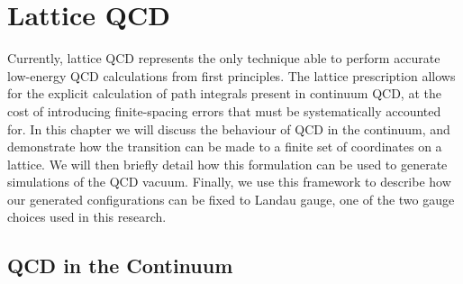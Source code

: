 
\chapter{Lattice QCD}\label{chapter:LatticeQCD}

\ifpdf
    \graphicspath{{Chapter2/Figs/Raster/}{Chapter2/Figs/PDF/}{Chapter2/Figs/}}
\else
    \graphicspath{{Chapter2/Figs/Vector/}{Chapter2/Figs/}}
\fi
Currently, lattice QCD represents the only technique able to perform accurate low-energy QCD calculations from first principles. The lattice prescription allows for the explicit calculation of path integrals present in continuum QCD, at the cost of introducing finite-spacing errors that must be systematically accounted for. In this chapter we will discuss the behaviour of QCD in the continuum, and demonstrate how the transition can be made to a finite set of coordinates on a lattice. We will then briefly detail how this formulation can be used to generate simulations of the QCD vacuum. Finally, we use this framework to describe how our generated configurations can be fixed to Landau gauge, one of the two gauge choices used in this research.

\section{QCD in the Continuum}
